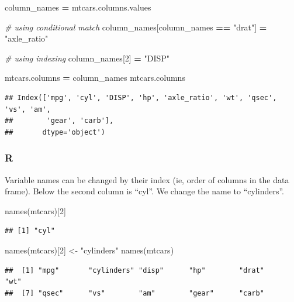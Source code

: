 \documentclass[
]{book}
\newenvironment{Shaded}{\begin{snugshade}}{\end{snugshade}}
\newcommand{\CommentTok}[1]{\textcolor[rgb]{0.56,0.35,0.01}{\textit{#1}}}
\newcommand{\DecValTok}[1]{\textcolor[rgb]{0.00,0.00,0.81}{#1}}
\newcommand{\FunctionTok}[1]{\textcolor[rgb]{0.00,0.00,0.00}{#1}}
\newcommand{\NormalTok}[1]{#1}
\newcommand{\OperatorTok}[1]{\textcolor[rgb]{0.81,0.36,0.00}{\textbf{#1}}}
\newcommand{\OtherTok}[1]{\textcolor[rgb]{0.56,0.35,0.01}{#1}}
\newcommand{\StringTok}[1]{\textcolor[rgb]{0.31,0.60,0.02}{#1}}
\begin{document}
\begin{Shaded}
\begin{Highlighting}[]
\NormalTok{column\_names }\OperatorTok{=}\NormalTok{ mtcars.columns.values}

\CommentTok{\# using conditional match}
\NormalTok{column\_names[column\_names }\OperatorTok{==} \StringTok{"drat"}\NormalTok{] }\OperatorTok{=} \StringTok{"axle\_ratio"}

\CommentTok{\# using indexing}
\NormalTok{column\_names[}\DecValTok{2}\NormalTok{] }\OperatorTok{=} \StringTok{"DISP"}

\NormalTok{mtcars.columns }\OperatorTok{=}\NormalTok{ column\_names}
\NormalTok{mtcars.columns}
\end{Highlighting}
\end{Shaded}

\begin{verbatim}
## Index(['mpg', 'cyl', 'DISP', 'hp', 'axle_ratio', 'wt', 'qsec', 'vs', 'am',
##        'gear', 'carb'],
##       dtype='object')
\end{verbatim}

\hypertarget{r-20}{%
\subsubsection*{R}\label{r-20}}

Variable names can be changed by their index (ie, order of columns in the data frame). Below the second column is ``cyl''. We change the name to ``cylinders''.

\begin{Shaded}
\begin{Highlighting}[]
\FunctionTok{names}\NormalTok{(mtcars)[}\DecValTok{2}\NormalTok{]}
\end{Highlighting}
\end{Shaded}

\begin{verbatim}
## [1] "cyl"
\end{verbatim}

\begin{Shaded}
\begin{Highlighting}[]
\FunctionTok{names}\NormalTok{(mtcars)[}\DecValTok{2}\NormalTok{] }\OtherTok{\textless{}{-}} \StringTok{"cylinders"}
\FunctionTok{names}\NormalTok{(mtcars)}
\end{Highlighting}
\end{Shaded}

\begin{verbatim}
##  [1] "mpg"       "cylinders" "disp"      "hp"        "drat"      "wt"       
##  [7] "qsec"      "vs"        "am"        "gear"      "carb"
\end{verbatim}
\end{document}
